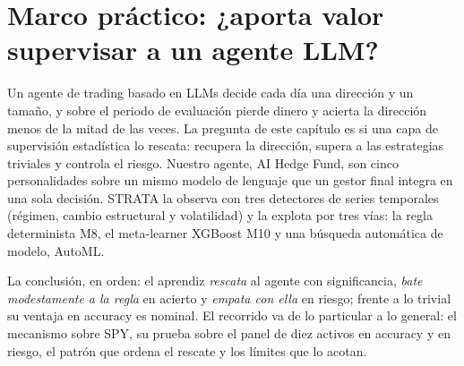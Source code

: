 \chapter{Marco práctico: ¿aporta valor supervisar a un agente LLM?}
\label{cap:marco-practico}


Un agente de trading basado en LLMs decide cada día una dirección y un tamaño, y sobre el periodo de evaluación pierde dinero y acierta la dirección menos de la mitad de las veces. La pregunta de este capítulo es si una capa de supervisión estadística lo rescata: recupera la dirección, supera a las estrategias triviales y controla el riesgo. Nuestro agente, AI Hedge Fund, son cinco personalidades sobre un mismo modelo de lenguaje que un gestor final integra en una sola decisión. STRATA la observa con tres detectores de series temporales (régimen, cambio estructural y volatilidad) y la explota por tres vías: la regla determinista M8, el meta-learner XGBoost M10 y una búsqueda automática de modelo, AutoML.

La conclusión, en orden: el aprendiz \emph{rescata} al agente con significancia, \emph{bate modestamente a la regla} en acierto y \emph{empata con ella} en riesgo; frente a lo trivial su ventaja en accuracy es nominal. El recorrido va de lo particular a lo general: el mecanismo sobre SPY, su prueba sobre el panel de diez activos en accuracy y en riesgo, el patrón que ordena el rescate y los límites que lo acotan.








